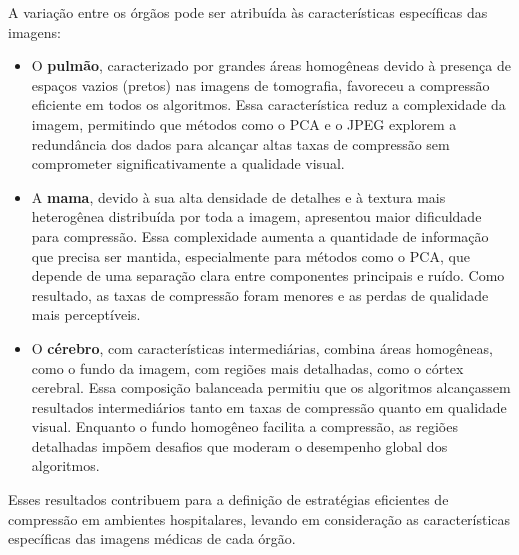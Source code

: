 A variação entre os órgãos pode ser atribuída às características específicas das imagens:

\begin{itemize}
    \item O \textbf{pulmão}, caracterizado por grandes áreas homogêneas devido à presença de espaços vazios (pretos) nas imagens de tomografia, favoreceu a compressão eficiente em todos os algoritmos. Essa característica reduz a complexidade da imagem, permitindo que métodos como o \acrshort{PCA} e o \acrshort{JPEG} explorem a redundância dos dados para alcançar altas taxas de compressão sem comprometer significativamente a qualidade visual.
    \item A \textbf{mama}, devido à sua alta densidade de detalhes e à textura mais heterogênea distribuída por toda a imagem, apresentou maior dificuldade para compressão. Essa complexidade aumenta a quantidade de informação que precisa ser mantida, especialmente para métodos como o \acrshort{PCA}, que depende de uma separação clara entre componentes principais e ruído. Como resultado, as taxas de compressão foram menores e as perdas de qualidade mais perceptíveis.
    \item O \textbf{cérebro}, com características intermediárias, combina áreas homogêneas, como o fundo da imagem, com regiões mais detalhadas, como o córtex cerebral. Essa composição balanceada permitiu que os algoritmos alcançassem resultados intermediários tanto em taxas de compressão quanto em qualidade visual. Enquanto o fundo homogêneo facilita a compressão, as regiões detalhadas impõem desafios que moderam o desempenho global dos algoritmos.
\end{itemize}

Esses resultados contribuem para a definição de estratégias eficientes de compressão em ambientes hospitalares, levando em consideração as características específicas das imagens médicas de cada órgão.
